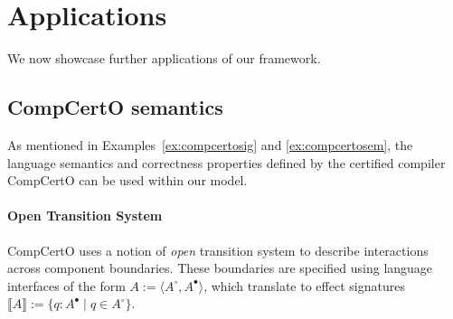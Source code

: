 \documentclass[acmsmall,screen,review,anonymous,nonacm]{acmart}
\newcommand{\que}{\circ}
\newcommand{\ans}{\bullet}
\begin{document}



\section{Applications} \label{sec:app} %

We now showcase further applications of our framework.

\subsection{CompCertO semantics}\label{sec:application:compcerto} %


As mentioned in Examples~\ref{ex:compcertosig} and \ref{ex:compcertosem},
the language semantics and correctness properties
defined by the certified compiler CompCertO
can be used within our model.

\paragraph{Open Transition System}
CompCertO
uses a notion of \emph{open} transition system
to describe interactions across component boundaries.
These boundaries are specified using
language interfaces of the form
$A := \langle A^\que, A^\ans \rangle$,
which translate to effect signatures
$\llbracket A \rrbracket := \{ q : A^\ans \mid q \in A^\que \}$.
\end{document}
